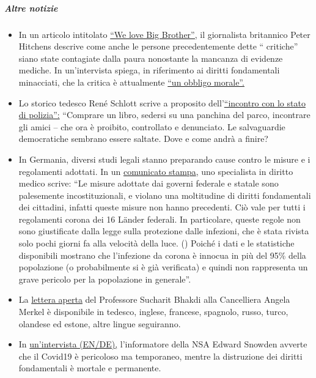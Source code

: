 \hypertarget{altre-notizie-1}{%
\subparagraph{\texorpdfstring{\textbf{Altre
notizie}}{Altre notizie}}\label{altre-notizie-1}}

\begin{itemize}
\tightlist
\item
  In un articolo intitolato
  \href{https://www.firstthings.com/web-exclusives/2020/04/we-love-big-brother}{``We
  love Big Brother'',} il giornalista britannico Peter Hitchens descrive
  come anche le persone precedentemente dette `` critiche'' siano state
  contagiate dalla paura nonostante la mancanza di evidenze mediche. In
  un'intervista spiega, in riferimento ai diritti fondamentali
  minacciati, che la critica è attualmente
  \href{https://www.spiked-online.com/podcast-episode/in-this-lockdown-dissent-is-a-moral-duty/}{``un
  obbligo morale''.}
\item
  Lo storico tedesco René Schlott scrive a proposito
  dell'\href{https://www.spiegel.de/politik/deutschland/corona-krise-und-buergerrechte-rendezvous-mit-dem-polizeistaat-a-68611322-f4d4-453f-aba5-5ec5a49ae329}{``incontro
  con lo stato di polizia'':} ``Comprare un libro, sedersi su una
  panchina del parco, incontrare gli amici -- che ora è proibito,
  controllato e denunciato. Le salvaguardie democratiche sembrano essere
  saltate. Dove e come andrà a finire?
\item
  In Germania, diversi studi legali stanno preparando cause contro le
  misure e i regolamenti adottati. In un
  \href{http://beatebahner.de/lib.medien/aktualisierte\%20Pressemitteilung.pdf}{comunicato
  stampa}, uno specialista in diritto medico scrive: ``Le misure
  adottate dai governi federale e statale sono palesemente
  incostituzionali, e violano una moltitudine di diritti fondamentali
  dei cittadini, infatti queste misure non hanno precedenti. Ciò vale
  per tutti i regolamenti corona dei 16 Länder federali. In particolare,
  queste regole non sono giustificate dalla legge sulla protezione dalle
  infezioni, che è stata rivista solo pochi giorni fa alla velocità
  della luce. () Poiché i dati e le statistiche disponibili mostrano che
  l'infezione da corona è innocua in più del 95\% della popolazione (o
  probabilmente si è già verificata) e quindi non rappresenta un grave
  pericolo per la popolazione in generale''.
\item
  La
  \href{https://swprs.org/offener-brief-von-professor-sucharit-bhakdi-an-bundeskanzlerin-dr-angela-merkel/}{lettera
  aperta} del Professore Sucharit Bhakdi alla Cancelliera Angela Merkel
  è disponibile in tedesco, inglese, francese, spagnolo, russo, turco,
  olandese ed estone, altre lingue seguiranno.
\item
  In \href{https://www.youtube.com/watch?v=-pcQFTzck_c}{un'intervista
  (EN/DE),} l'informatore della NSA Edward Snowden avverte che il
  Covid19 è pericoloso ma temporaneo, mentre la distruzione dei diritti
  fondamentali è mortale e permanente.
\end{itemize}

